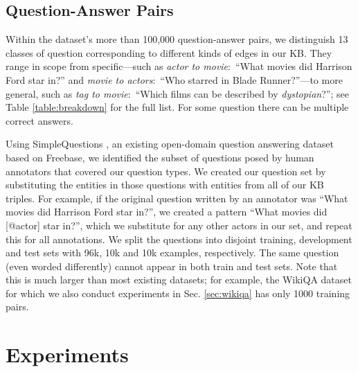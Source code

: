 \documentclass[11pt,letterpaper]{article}
\newcommand{\WikiMovies}{{\sc WikiMovies}\xspace}
\begin{document}
\subsection{Question-Answer Pairs}
Within the dataset's more than 100,000 question-answer pairs, we distinguish 13
classes of question corresponding to different kinds of edges in our KB.
They range in scope from specific---such as
{\em actor to movie}:~``What movies did Harrison Ford star in?'' and
{\em movie to actors}:~``Who starred in Blade Runner?''---to more general,
such as {\em tag to movie}:~``Which films can be described by {\em dystopian}?'';
see Table \ref{table:breakdown} for the full list.
For some question there can be multiple correct answers.


Using SimpleQuestions \citep{bordes2015large},
an existing open-domain question answering dataset based on Freebase,
we identified the subset of questions posed by human annotators that covered
our question types.
We created our question set by substituting the entities in those questions
with entities from all of our KB triples.
For example, if the original question written by an annotator was
``What movies did Harrison Ford star in?'', we created a pattern
``What movies did [@actor] star in?'', which we substitute for any
other actors in our set, and repeat this for all annotations.
We split the questions into disjoint training, development and test sets
with 96k, 10k and 10k examples, respectively.
The same question (even worded differently) cannot appear in
both train and test sets.
Note that this is much larger than most existing datasets;
for example, the {\sc WikiQA} dataset \citep{yang2015wikiqa}
for which we also conduct experiments
in Sec. \ref{sec:wikiqa} has only 1000 training pairs.
 
\section{Experiments}\label{sec:exp}
\vspace{-0.5ex}
\begin{table}[t!]
	\begin{center}
	\label{tab:WikiMoviesres}
    	\caption{
          \label{table:main-res}
          { Test results (\% hits@1)
on \WikiMovies, comparing human-annotated KB (KB), information extraction-based KB (IE),
and directly reading Wikipedia documents (Doc).}}
  	\end{center}
\end{table}
\end{document}
